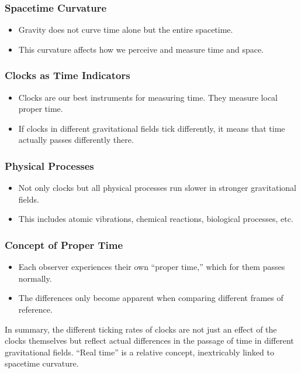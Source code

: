 \documentclass[a4paper,12pt]{article}
\begin{document}
	\subsubsection{Spacetime Curvature}
	\begin{itemize}
		\item Gravity does not curve time alone but the entire spacetime.
		\item This curvature affects how we perceive and measure time and space.
	\end{itemize}
	
	\subsubsection{Clocks as Time Indicators}
	\begin{itemize}
		\item Clocks are our best instruments for measuring time. They measure local proper time.
		\item If clocks in different gravitational fields tick differently, it means that time actually passes differently there.
	\end{itemize}
	
	\subsubsection{Physical Processes}
	\begin{itemize}
		\item Not only clocks but all physical processes run slower in stronger gravitational fields.
		\item This includes atomic vibrations, chemical reactions, biological processes, etc.
	\end{itemize}
	
	\subsubsection{Concept of Proper Time}
	\begin{itemize}
		\item Each observer experiences their own ``proper time,'' which for them passes normally.
		\item The differences only become apparent when comparing different frames of reference.
	\end{itemize}
	
	In summary, the different ticking rates of clocks are not just an effect of the clocks themselves but reflect actual differences in the passage of time in different gravitational fields. ``Real time'' is a relative concept, inextricably linked to spacetime curvature.
	
\end{document}
